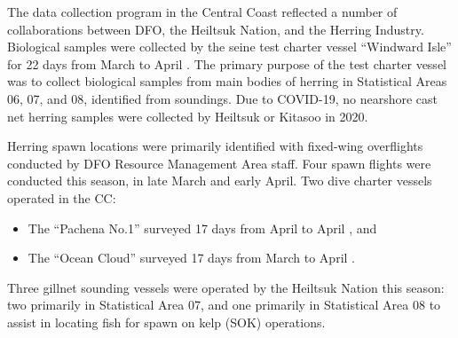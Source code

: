 The data collection program in the Central Coast reflected a number of collaborations between DFO, the Heiltsuk Nation, and the Herring Industry.
Biological samples were collected by the seine test charter vessel ``Windward Isle'' for 22 days from March  to April .
The primary purpose of the test charter vessel was to collect biological samples from main bodies of herring in Statistical Areas 06, 07, and 08, identified from soundings.
Due to COVID-19, no nearshore cast net herring samples were collected by Heiltsuk or Kitasoo in 2020.

Herring spawn locations were primarily identified with fixed-wing overflights conducted by DFO Resource Management Area staff.
Four spawn flights were conducted this season, in late March and early April.
Two dive charter vessels operated in the CC:
\begin{itemize}
\item The ``Pachena No.1'' surveyed 17 days from April  to April , and
\item The ``Ocean Cloud'' surveyed 17 days from March  to April .
\end{itemize}
Three gillnet sounding vessels were operated by the Heiltsuk Nation this season:
two primarily in Statistical Area 07, and
one primarily in Statistical Area 08 to assist in locating fish for spawn on kelp (SOK) operations.